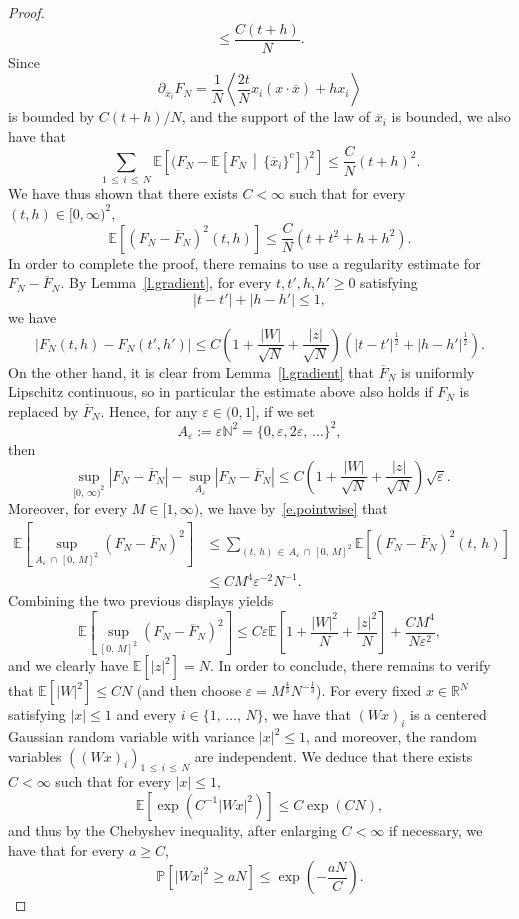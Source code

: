\documentclass[10pt]{amsart}
\theoremstyle{definition}\newtheorem{defi}[theo]{Definition}\newtheorem{rema}[theo]{Remark}\newtheorem{exam}[theo]{Example}\newtheorem{exem}[theo]{Example}\newtheorem{nota}[theo]{Notation}
\newcommand{\N}{\mathbb{N}}
\newcommand{\R}{\mathbb{R}}
\newcommand{\E}{\mathbb{E}}
\renewcommand{\P}{\mathbb{P}}
\newcommand{\1}{\mathds{1}}
\newcommand{\ep}{\varepsilon}
\newcommand{\eps}{\varepsilon}
\renewcommand{\le}{\leqslant}
\renewcommand{\ge}{\geqslant}
\newcommand{\la}{\left\langle}
\newcommand{\ra}{\right\rangle}
\renewcommand{\bar}{\overline}
\begin{document}
\begin{proof}
\[\le \frac{C (t+h)}{N}.
\]
Since
\[
\partial_{\bar x_i} F_N = \frac 1 N \la \frac {2t} N x_i \left(x \cdot \bar x \right) + hx_i\ra
\]
is bounded by $C(t+h)/N$, and the support of the law of $\bar x_i$ is bounded, we also have that
\[
\sum_{1\,\le\,i\,\le\,N} \E \left[\big(F_N - \E\left[F_N \, \middle| \, \{\bar x_{i}\}^c\right] \big)^2 \right]\le \frac{C}N(t+h)^2.
\]
We have thus shown that there exists $C < \infty$ such that for every $(t,h) \in [0,\infty)^2$,
\begin{equation}\label{e.pointwise}
\E \left[\left(F_N - \bar F_N \right)^2 (t,h) \right] \le \frac{C}{N}\left(t+t^2 + h+h^2\right).
\end{equation}
In order to complete the proof, there remains to use a regularity estimate for $F_N - \bar F_N$. By Lemma~\ref{l.gradient}, for every $t,t',h,h' \ge 0$ satisfying
\[
\left|t-t'\right| + \left|h-h'\right| \le 1,
\]
we have
\[
\left|F_N(t,h) - F_N(t',h')\right| \le C \left(1 + \frac{|W|}{\sqrt{N}} + \frac{|z|}{\sqrt{N}} \right) \left(\left|t-t'\right|^\frac 1 2 + \left|h-h'\right|^\frac 1 2 \right).
\]
On the other hand, it is clear from Lemma~\ref{l.gradient} that $\bar F_N$ is uniformly Lipschitz continuous, so in particular the estimate above also holds if $F_N$ is replaced by $\bar F_N$. Hence, for any $\eps \in (0,1]$, if we set
\[
A_\ep := \ep \N^2 = \{0,\ep, 2\ep,\,\ldots\}^2,
\]
then
\[
\sup_{[0,\,\infty)^2} \left|F_N - \bar F_N\right| - \sup_{A_\ep} \left|F_N - \bar F_N\right| \le C \left(1 + \frac{|W|}{\sqrt{N}} + \frac{|z|}{\sqrt{N}} \right) \sqrt{\ep}.
\]
Moreover, for every $M \in [1,\infty)$, we have by~\eqref{e.pointwise} that
\begin{align*}
\E \left[\sup_{A_\ep\,\cap\,[0,\,M]^2} \left(F_N - \bar F_N\right)^2\right] & \le \sum_{(t,\,h)\,\in\,A_\ep\,\cap\,[0,\,M]^2} \E \left[\left(F_N - \bar F_N\right)^2(t,\,h) \right]
\\
& \le C M^4 \ep^{-2} N^{-1}.
\end{align*}
Combining the two previous displays yields
\[
\E \left[\sup_{\left[0,\,M\right]^2} \left(F_N - \bar F_N\right)^2 \right] \le C \ep \E \left[1 + \frac{|W|^2}{{N}} + \frac{|z|^2}{{N}} \right] + \frac{C M^4}{N\ep^2},
\]
and we clearly have $\E[|z|^2] = N$. In order to conclude, there remains to verify that $\E[|W|^2] \le C N$ (and then choose $\ep = M^\frac 4 3 N^{-\frac 13}$). For every fixed $x \in \R^N$ satisfying $|x| \le 1$ and every $i \in \{1,\,\ldots,\,N\}$, we have that $(Wx)_i$ is a centered Gaussian random variable with variance $|x|^2 \le 1$, and moreover, the random variables $((Wx)_i)_{1\,\le\,i\,\le\,N}$ are independent. We deduce that there exists $C < \infty$ such that for every $|x| \le 1$,
\[
\E \left[\exp \left(C^{-1} \left|Wx\right|^2 \right) \right] \le C\exp \left(C N \right),
\]
and thus by the Chebyshev inequality, after enlarging $C < \infty$ if necessary, we have that for every $a \ge C$,
\[
\P \left[\left|Wx\right|^2 \ge aN \right] \le \exp \left(-\frac{aN}{C} \right).
\]


\end{proof}
\end{document}
